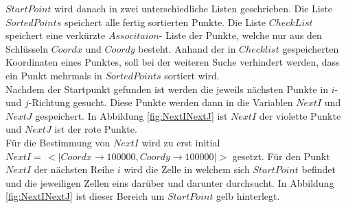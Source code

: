$StartPoint$ wird danach in zwei unterschiedliche Listen geschrieben. Die Liste $SortedPoints$ speichert alle fertig sortierten Punkte. Die Liste $CheckList$ speichert eine verkürzte $Associtaion$- Liste der Punkte, welche nur aus den Schlüsseln $Coordx$ und $Coordy$ besteht. Anhand der in $Checklist$ gespeicherten Koordinaten eines Punktes, soll bei der weiteren Suche verhindert werden, dass ein Punkt mehrmals in $SortedPoints$ sortiert wird.\\



%
% 
Nachdem der Startpunkt gefunden ist werden die jeweils nächsten Punkte in $i$- und $j$-Richtung gesucht. Diese Punkte werden dann in die Variablen $NextI$ und $NextJ$ gespeichert. In Abbildung \ref{fig:NextINextJ} ist $NextI$ der violette Punkte und $NextJ$ ist der rote Punkte. \\

Für die Bestimmung von $NextI$ wird zu erst initial $NextI = \, <|Coordx \rightarrow 100 000, Coordy \rightarrow 100 000|>$ gesetzt. Für den Punkt $NextI$ der nächsten Reihe $i$ wird die Zelle in welchem sich $StartPoint$ befindet und die jeweiligen Zellen eins darüber und darunter durchsucht. In Abbildung \ref{fig:NextINextJ} ist dieser Bereich um $StartPoint$ gelb hinterlegt. 



